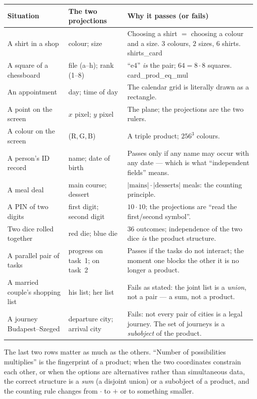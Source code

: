 \documentclass[11pt,a4paper]{article}
\theoremstyle{definition}
\newcommand{\lean}[1]{\textsf{\small #1}}
\begin{document}
\begin{longtable}{@{}p{}p{}p{}@{}}
\toprule
\textbf{Situation} & \textbf{The two projections} & \textbf{Why it passes (or fails)}\\
\midrule
\endhead
A shirt in a shop & colour; size & Choosing a shirt $=$ choosing a colour and a size.
$3$ colours, $2$ sizes, $6$ shirts. \lean{shirts\_card}\\
A square of a chessboard & file (a--h); rank (1--8) & ``e4'' \emph{is} the pair; $64=8\cdot 8$
squares. \lean{card\_prod\_eq\_mul}\\
An appointment & day; time of day & The calendar grid is literally drawn as a rectangle.\\
A point on the screen & $x$ pixel; $y$ pixel & The plane; the projections are the two rulers.\\
A colour on the screen & (R,\,G,\,B) & A triple product; $256^3$ colours.\\
A person's ID record & name; date of birth & Passes only if any name may occur with any date
--- which is what ``independent fields'' means.\\
A meal deal & main course; dessert & $|\text{mains}|\cdot|\text{desserts}|$ meals: the
counting principle.\\
A PIN of two digits & first digit; second digit & $10\cdot 10$; the projections are
``read the first/second symbol''.\\
Two dice rolled together & red die; blue die & $36$ outcomes; independence of the two dice
\emph{is} the product structure.\\
A parallel pair of tasks & progress on task~1; on task~2 & Passes if the tasks do not
interact; the moment one blocks the other it is no longer a product.\\
A married couple's shopping list & his list; her list & Fails as stated: the joint list is a
\emph{union}, not a pair --- a sum, not a product.\\
A journey Budapest--Szeged & departure city; arrival city & Fails: not every pair of cities
is a legal journey.  The set of journeys is a \emph{subobject} of the product.\\
\bottomrule
\end{longtable}

\noindent
The last two rows matter as much as the others.  ``Number of possibilities multiplies'' is
the fingerprint of a product; when the two coordinates constrain each other, or when the
options are alternatives rather than simultaneous data, the correct structure is a
\emph{sum} (a disjoint union) or a subobject of a product, and the counting rule changes
from $\cdot$ to $+$ or to something smaller.
\end{document}
